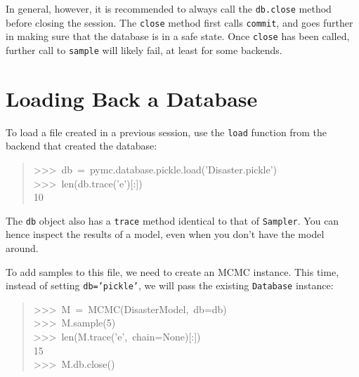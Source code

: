 In general, however, it is recommended to always call the \texttt{db.close} method
before closing the session. The \texttt{close} method first calls \texttt{commit}, and
goes further in making sure that the database is in a safe state. Once \texttt{close}
has been called, further call to \texttt{sample} will likely fail, at least
for some backends.
\begin{center}\begin{sffamily}
\end{sffamily}
\end{center}



\hypertarget{loading-back-a-database}{}
\section*{Loading Back a Database}
\label{loading-back-a-database}

To load a file created in a previous session, use the \texttt{load} function
from the backend that created the database:
\begin{quote}{\ttfamily \raggedright \noindent
>{}>{}>~db~=~pymc.database.pickle.load('Disaster.pickle')~\\
>{}>{}>~len(db.trace('e'){[}:{]})~\\
10
}\end{quote}

The \texttt{db} object also has a \texttt{trace} method identical to that of \texttt{Sampler}.
You can hence inspect the results of a model, even when you don't have the model
around.

To add samples to this file, we need to create an MCMC instance. This time,
instead of setting \texttt{db='pickle'}, we will pass the existing \texttt{Database}
instance:
\begin{quote}{\ttfamily \raggedright \noindent
>{}>{}>~M~=~MCMC(DisasterModel,~db=db)~\\
>{}>{}>~M.sample(5)~\\
>{}>{}>~len(M.trace('e',~chain=None){[}:{]})~\\
15~\\
>{}>{}>~M.db.close()
}\end{quote}


